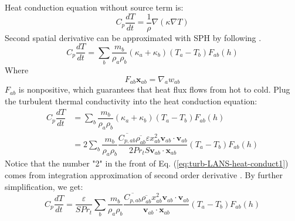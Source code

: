 \documentclass[journal abbreviation, manuscript]{copernicus}
\begin{document}
Heat conduction equation without source term is:
\begin{equation}
C_p \dfrac{dT}{dt} = \dfrac{1}{\rho} \nabla \left(\kappa \nabla T\right)
\end{equation}
Second spatial derivative can be approximated with SPH by following \citet{monaghan2005smoothed}. 
\begin{equation}
C_p \dfrac{dT}{dt} = \sum_b \dfrac{m_b}{\rho_a \rho_b} \left(\kappa_a + \kappa_b\right) \left(T_a - T_b\right) F_{ab} \left(h\right)
\end{equation}
Where
\begin{equation}
F_{ab} \textbf{x}_{ab} = \nabla _a w_{ab}
\end{equation}
$F_{ab}$ is nonpositive, which guarantees that heat flux flows from hot to cold. 
Plug the turbulent thermal conductivity into the heat conduction equation:
\begin{equation}
\begin{split}
C_p \dfrac{dT}{dt}
& = \sum_b \dfrac{m_b}{\rho_a \rho_b} \left(\kappa_a + \kappa_b\right) \left(T_a - T_b\right) F_{ab} \left(h\right) \\
 &= 2 \sum_b \dfrac{m_b}{\rho_a \rho_b} \dfrac{\overline{C_{p,ab}} \overline{\rho_{ab}} \varepsilon x_{ab}^2 \textbf{v}_{ab} \cdot \textbf{v}_{ab}}{2 Pr_t  S \textbf{v}_{ab} \cdot \textbf{x}_{ab} } \left(T_a - T_b\right) F_{ab} \left(h\right)
\end{split}
\label{eq:turb-LANS-heat-conduct1}
\end{equation}
Notice that the number "2" in the front of Eq. (\ref{eq:turb-LANS-heat-conduct1}) comes from integration approximation of second order derivative \citep {cleary1999conduction}. By further simplification, we get:
\begin{equation}
C_p \dfrac{dT}{dt}
 =\dfrac{\varepsilon}{S  Pr_t}  \sum_b \dfrac{m_b}{\rho_a \rho_b} \dfrac{\overline{C_{p,ab}} \overline{\rho_{ab}} x_{ab}^2 \textbf{v}_{ab} \cdot \textbf{v}_{ab}}{\textbf{v}_{ab} \cdot \textbf{x}_{ab}} \left(T_a - T_b\right) F_{ab} \left(h\right)
\end{equation}
\end{document}
